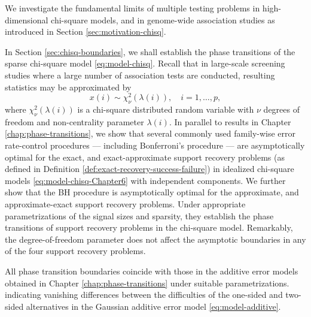 
We investigate the fundamental limits of multiple testing problems in high-dimensional chi-square models, and in genome-wide association studies as introduced in Section \ref{sec:motivation-chisq}.

In Section \ref{sec:chisq-boundaries}, we shall establish the phase transitions of the sparse chi-square model \eqref{eq:model-chisq}.
Recall that in large-scale screening studies where a large number of association tests are conducted, resulting statistics may be approximated by
\begin{equation} \label{eq:model-chisq-Chapter6}
    x(i) \sim \chi_\nu^2\left(\lambda(i)\right), \quad i=1,\ldots,p,
\end{equation}
where $\chi_\nu^2\left(\lambda(i)\right)$ is a chi-square distributed random variable with $\nu$ degrees of freedom and non-centrality parameter $\lambda(i)$.
In parallel to results in Chapter \ref{chap:phase-transitions}, we show that several commonly used family-wise error rate-control procedures --- including Bonferroni's procedure --- are asymptotically optimal for the {exact}, and {exact-approximate} support recovery problems (as defined in Definition \ref{def:exact-recovery-success-failure}) in idealized chi-square models \eqref{eq:model-chisq-Chapter6} with independent components.
We further show that the \ac{BH} procedure is asymptotically optimal for the {approximate}, and {approximate-exact} support recovery problems.
Under appropriate parametrizations of the signal sizes and sparsity, they establish the phase transitions of support recovery problems in the chi-square model.
Remarkably, the degree-of-freedom parameter does not affect the asymptotic boundaries in any of the four support recovery problems.

All phase transition boundaries coincide with those in the additive error models obtained in Chapter \ref{chap:phase-transitions} under suitable parametrizations.
indicating vanishing differences between the difficulties of the one-sided and two-sided alternatives in the Gaussian additive error model \eqref{eq:model-additive}.

\medskip

